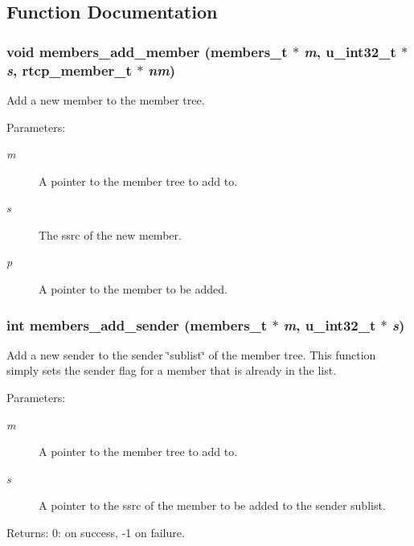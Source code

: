 \subsection{Function Documentation}
\subsubsection{\setlength{\rightskip}{0pt plus 5cm}void members\_\-add\_\-member ({\bf members\_\-t} $\ast$ {\em m}, u\_\-int32\_\-t $\ast$ {\em s}, {\bf rtcp\_\-member\_\-t} $\ast$ {\em nm})}\label{members_8h_a2}


Add a new member to the member tree. \begin{Desc}
\item[Parameters:]
\begin{description}
\item[{\em m}]A pointer to the member tree to add to. \item[{\em s}]The ssrc of the new member. \item[{\em p}]A pointer to the member to be added. \end{description}
\end{Desc}
\subsubsection{\setlength{\rightskip}{0pt plus 5cm}int members\_\-add\_\-sender ({\bf members\_\-t} $\ast$ {\em m}, u\_\-int32\_\-t $\ast$ {\em s})}\label{members_8h_a4}


Add a new sender to the sender \char`\"{}sublist\char`\"{} of the member tree. This function simply sets the sender flag for a member that is already in the list. \begin{Desc}
\item[Parameters:]
\begin{description}
\item[{\em m}]A pointer to the member tree to add to. \item[{\em s}]A pointer to the ssrc of the member to be added to the sender sublist. \end{description}
\end{Desc}
\begin{Desc}
\item[Returns:]0: on success, -1 on failure. \end{Desc}
